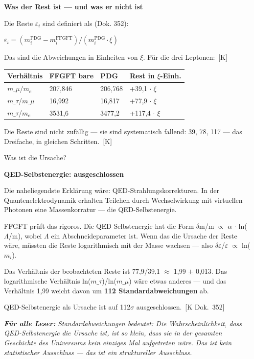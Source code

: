 \documentclass[11pt,oneside]{book}
\newcommand{\status}[1]{\penalty10000\,{\scriptsize\textcolor{gray!60}{[#1]}}}
\newenvironment{laierspur}{%
  \par\vspace{4pt}%
  \noindent\small\itshape\color{blue!60!black}%
  \textbf{Für alle Leser:}\enspace\ignorespaces}{%
  \par\vspace{4pt}\normalsize\normalfont\normalcolor}
\begin{document}
\textbf{Was der Rest ist — und was er nicht ist}


Die Reste $\varepsilon_i$ sind definiert als (Dok. 352):


$\varepsilon_i = (m_i^\text{PDG} - m_i^\text{FFGFT}) / (m_i^\text{PDG} \cdot \xi)$


Das sind die Abweichungen in Einheiten von $\xi$. Für die drei Leptonen: \status{K}


\begin{center}
\small
\begin{tabular}{lp{1.8cm}p{1.5cm}p{2.8cm}}
\toprule
Verhältnis & FFGFT bare & PDG & Rest in $\xi$-Einh. \\
\midrule
$m\_\mu$/$m_e$ & 207,846 & 206,768 & +39,1 $\cdot$ $\xi$ \\
$m\_\tau$/$m\_\mu$ & 16,992 & 16,817 & +77,9 $\cdot$ $\xi$ \\
$m\_\tau$/$m_e$ & 3531,6 & 3477,2 & +117,4 $\cdot$ $\xi$ \\
\bottomrule
\end{tabular}
\end{center}

Die Reste sind nicht zufällig — sie sind systematisch fallend: 39, 78, 117
— das Dreifache, in gleichen Schritten. \status{K}


Was ist die Ursache?


\textbf{QED-Selbstenergie: ausgeschlossen}


Die naheliegendste Erklärung wäre: QED-Strahlungskorrekturen. In der
Quantenelektrodynamik erhalten Teilchen durch Wechselwirkung mit virtuellen
Photonen eine Massenkorratur — die QED-Selbstenergie.


FFGFT prüft das rigoros. Die QED-Selbstenergie hat die Form
$\delta$m/m $\propto$ $\alpha$ $\cdot$ ln($\Lambda$/m), wobei $\Lambda$ ein Abschneideparameter ist. Wenn das
die Ursache der Reste wäre, müssten die Reste logarithmisch mit der Masse
wachsen — also $\delta\varepsilon$/$\varepsilon$ $\propto$ ln($m_i$).


Das Verhältnis der beobachteten Reste ist 77,9/39,1 $\approx$ 1,99 $\pm$ 0,013.
Das logarithmische Verhältnis ln($m\_\tau$)/ln($m\_\mu$) wäre etwas anderes —
und das Verhältnis 1,99 weicht davon um \textbf{112 Standardabweichungen} ab.


QED-Selbstenergie als Ursache ist auf 112$\sigma$ ausgeschlossen. \status{K Dok.~352}


\begin{laierspur}
112 Standardabweichungen bedeutet: Die Wahrscheinlichkeit,
dass QED-Selbstenergie die Ursache ist, ist so klein, dass sie in der
gesamten Geschichte des Universums kein einziges Mal aufgetreten wäre.
Das ist kein statistischer Ausschluss — das ist ein struktureller Ausschluss.
\end{laierspur}
\end{document}
